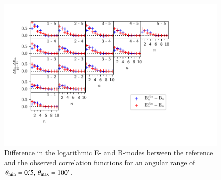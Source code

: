 \begin{figure}
\centering
\includegraphics[width = \textwidth, trim = {0 1.5cm 2.5cm 0}, clip]{images/eandbmodes0p5t100.pdf}
\caption{Difference in the logarithmic E- and B-modes between the reference and the observed correlation functions for an angular range of $\theta_{\mathrm{min}}=0.\!^\prime 5,\,\theta_{\mathrm{max}}=100^\prime$.}
\label{fig:bmodes_cosebi}
\end{figure}
